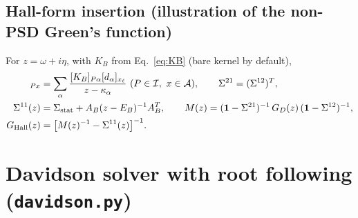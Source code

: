 \documentclass[11pt,a4paper]{article}
\newcommand{\code}[1]{\texttt{#1}}
\begin{document}
\subsection{Hall-form insertion (illustration of the non-PSD Green's function)}

For $z=\omega+i\eta$, with $K_B$ from Eq.~\eqref{eq:KB} (bare kernel by
default),
\begin{align}
  [\Sigma^{12}(z)]_{Px}&=\sum_\alpha\frac{[K_B]_{P\alpha}[d_\alpha]_{x_\ell}}{z-\kappa_\alpha}\ (P\in\mathcal I,\ x\in\mathcal A),\qquad
  \Sigma^{21}=(\Sigma^{12})^{T},\nonumber\\
  \Sigma^{11}(z)&=\Sigma_{\rm stat}+A_B(z-E_B)^{-1}A_B^{T},\qquad
  M(z)=(\mathbf 1-\Sigma^{21})^{-1}\,G_D(z)\,(\mathbf 1-\Sigma^{12})^{-1},\nonumber\\
  G_{\rm Hall}(z)&=\bigl[M(z)^{-1}-\Sigma^{11}(z)\bigr]^{-1}.
  \label{eq:hall}
\end{align}

\section{Davidson solver with root following (\code{davidson.py})}
\label{sec:davidson}
\end{document}
